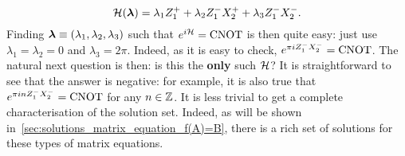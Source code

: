 \begin{example}
\begin{equation}
    \mathcal{H}(\boldsymbol{\lambda}) = \lambda_1 Z_1^+ + \lambda_2 Z_1^- X_2^+ + \lambda_3 Z_1^- X_2^-.
\end{equation}
Finding $\boldsymbol{\lambda}\equiv(\lambda_1,\lambda_2,\lambda_3)$ such that $e^{i\mathcal{H}}=\operatorname{CNOT}$ is then quite easy: just use $\lambda_1=\lambda_2=0$ and $\lambda_3=2\pi$. Indeed, as it is easy to check, $e^{\pi i Z_1^- X_2^-} = \operatorname{CNOT}$.
The natural next question is then: is this the \textbf{only} such $\mathcal{H}$? It is straightforward to see that the answer is negative: for example, it is also true that $e^{\pi i n Z_1^- X_2^-}=\operatorname{CNOT}$ for any $n\in\mathbb{Z}$.
It is less trivial to get a complete characterisation of the solution set.
Indeed, as will be shown in~\cref{sec:solutions_matrix_equation_f(A)=B}, there is a rich set of solutions for these types of matrix equations.
\end{example}

